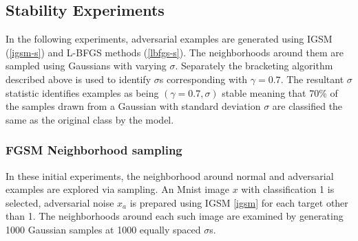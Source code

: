 \documentclass[10pt]{extarticle}
\begin{document}


\subsection{Stability Experiments}
In the following experiments, adversarial examples are generated using IGSM (\ref{igsm-s}) and L-BFGS methods (\ref{lbfgs-s}). The neighborhoods around them are sampled using Gaussians with varying $\sigma$. Separately the bracketing algorithm described above is used to identify $\sigma$s corresponding with $\gamma=0.7$. The resultant $\sigma$ statistic identifies examples as being $(\gamma=0.7,\sigma)$ stable meaning that 70\% of the samples drawn from a Gaussian with standard deviation $\sigma$ are classified the same as the original class by the model. 




\subsubsection{FGSM Neighborhood sampling}
In these initial experiments, the neighborhood around normal and adversarial examples are explored via sampling. An Mnist image $x$ with classification 1 is selected, adversarial noise $x_a$ is prepared using IGSM \ref{igsm} for each target other than 1. The neighborhoods around each such image are examined by generating 1000 Gaussian samples at 1000 equally spaced $\sigma$s. 
\end{document}
